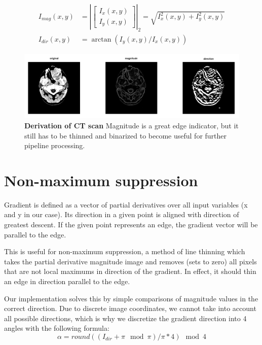 \documentclass[fleqn,moreauthors,10pt]{ds_report}
\begin{document}
\begin{equation}
	\begin{aligned}
		I_{mag}(x, y) & = |\begin{bmatrix}I_x(x, y) \\ I_y(x, y)\end{bmatrix}|_2 
			= \sqrt{I_x^2(x, y) + I_y^2(x, y)} \\
		I_{dir}(x, y) & = \arctan(I_y(x, y) / I_x(x, y))
	\end{aligned}
\end{equation}

\begin{figure}[h]\centering
	\includegraphics[width=\linewidth]{mag_dir.png}
	\caption{\textbf{Derivation of CT scan} Magnitude is a great edge indicator, but it still has to be thinned and binarized to become useful for further pipeline processing.}
	\label{fig:gaussians}
\end{figure}

\section*{Non-maximum suppression}

Gradient is defined as a vector of partial derivatives over all input variables (x and y in our case). Its direction in a given point is aligned with direction of greatest descent. If the given point represents an edge, the gradient vector will be parallel to the edge.

This is useful for non-maximum suppression, a method of line thinning which takes the partial derivative magnitude image and removes (sets to zero) all pixels that are not local maximums in direction of the gradient. In effect, it should thin an edge in direction parallel to the edge. 

Our implementation solves this by simple comparisons of magnitude values in the correct direction. Due to discrete image coordinates, we cannot take into account all possible directions, which is why we discretize the gradient direction into 4 angles with the following formula: 
\begin{equation}
	\alpha = round((I_{dir} + \pi \mod \pi) / \pi * 4) \mod 4	
\end{equation}
\end{document}
